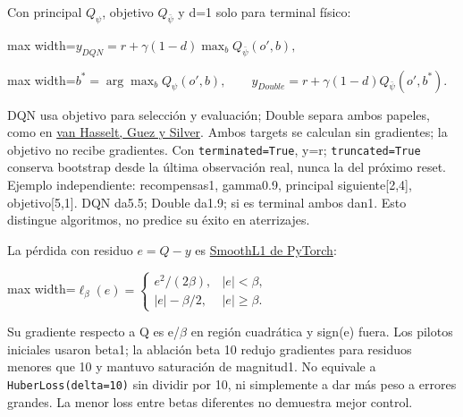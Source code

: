 \documentclass[12pt,a4paper]{article}
\begin{document}
Con principal $Q_\psi$,\allowbreak{} objetivo $Q_{\bar\psi}$ y d=1 solo para terminal físico:



\begin{center}\begin{adjustbox}{max width=\linewidth}$\displaystyle y_{DQN}=r+\gamma(1-d)\max_b Q_{\bar\psi}(o',b),$\end{adjustbox}\end{center}


\begin{center}\begin{adjustbox}{max width=\linewidth}$\displaystyle b^*=\arg\max_b Q_\psi(o',b),\qquad
y_{Double}=r+\gamma(1-d)Q_{\bar\psi}(o',b^*).$\end{adjustbox}\end{center}



DQN usa objetivo para selección y evaluación; Double separa ambos papeles,\allowbreak{} como en \href{https://arxiv.org/html/1509.06461v3}{van Hasselt,\allowbreak{} Guez y Silver}. Ambos targets se calculan sin gradientes; la objetivo no recibe gradientes. Con \nolinkurl{terminated=True},\allowbreak{} y=r; \nolinkurl{truncated=True} conserva bootstrap desde la última observación real,\allowbreak{} nunca la del próximo reset. Ejemplo independiente: recompensas1,\allowbreak{} gamma0.9,\allowbreak{} principal siguiente[2,\allowbreak{}4],\allowbreak{} objetivo[5,\allowbreak{}1]. DQN da5.5; Double da1.9; si es terminal ambos dan1. Esto distingue algoritmos,\allowbreak{} no predice su éxito en aterrizajes.


La pérdida con residuo $e=Q-y$ es \href{https://docs.pytorch.org/docs/2.15/generated/torch.nn.SmoothL1Loss.html}{SmoothL1 de PyTorch}:



\begin{center}\begin{adjustbox}{max width=\linewidth}$\displaystyle \ell_\beta(e)=\begin{cases}e^2/(2\beta),&|e|<\beta,\\|e|-\beta/2,&|e|\ge\beta.\end{cases}$\end{adjustbox}\end{center}



Su gradiente respecto a Q es e/\allowbreak{}\ensuremath{\beta} en región cuadrática y sign(e) fuera. Los pilotos iniciales usaron beta1; la ablación beta 10 redujo gradientes para residuos menores que 10 y mantuvo saturación de magnitud1. No equivale a \nolinkurl{HuberLoss(delta=10)} sin dividir por 10,\allowbreak{} ni simplemente a dar más peso a errores grandes. La menor loss entre betas diferentes no demuestra mejor control.
\end{document}
